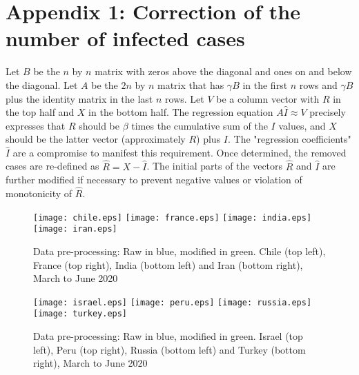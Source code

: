 \documentclass{article}
\begin{document}
\section{Appendix 1: Correction of the number of infected cases}

Let $B$ be the $n$ by $n$ matrix with zeros above the diagonal and ones on and below the diagonal. Let $A$ be the $2 n$ by $n$ matrix that has $\gamma B$ in the first $n$ rows and $\gamma B$ plus the identity matrix in the last $n$ rows. Let $V$ be a column vector with $R$ in the top half and $X$ in the bottom half. The regression equation $A \hat{I} \approx V$
precisely expresses that $R$ should be $\beta$ times the cumulative sum of the $I$ values, and $X$ should be the latter vector (approximately $R$) plus $I$. The "regression coefficients" $\hat{I}$ are a compromise to manifest this requirement. Once determined, the removed cases are re-defined as $\hat{R}=X-\hat{I}$. The initial parts of the vectors $\hat{R}$ and $\hat{I}$ are further modified if necessary to prevent negative values or violation of monotonicity of $\hat{R}$.

\begin{figure}[H]
\begin{center}
{\texttt{[image: chile.eps]}}
\qquad
{\texttt{[image: france.eps]}}
\qquad
{\texttt{[image: india.eps]}}
\qquad
{\texttt{[image: iran.eps]}}
\end{center}
\begin{center}
\caption{Data pre-processing: Raw in blue, modified in green. Chile (top left), France (top right), India (bottom left) and Iran (bottom right), March to June 2020
}
\label{fig:chile_france_india_iran_07_06_2020}
\end{center}
\end{figure}

\begin{figure}[H]
    \begin{center}
        {\texttt{[image: israel.eps]}}
        \qquad
        {\texttt{[image: peru.eps]}}
        \qquad
    {\texttt{[image: russia.eps]}}
    \qquad
    {\texttt{[image: turkey.eps]}}
    \end{center}
    \begin{center}
    \caption{Data pre-processing: Raw in blue, modified in green. Israel (top left), Peru (top right), Russia (bottom left) and Turkey (bottom right), March to June 2020
    }
\label{fig:israel_peru_russia_turkey_07_06_2020}
    \end{center}
\end{figure}
\end{document}
